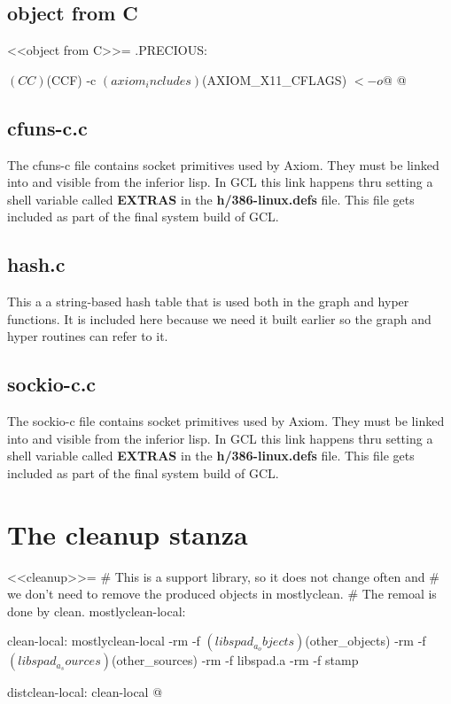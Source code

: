 \documentclass{article}
\begin{document}
\subsection{object from C}
<<object from C>>=
.PRECIOUS: %

	$(CC) $(CCF) -c $(axiom_includes) $(AXIOM_X11_CFLAGS) $< -o $@
@



\subsection{cfuns-c.c \cite{2}}
The cfuns-c file contains socket primitives used by Axiom.
They must be linked into and visible from the inferior lisp.
In GCL this link happens thru setting a shell variable called
{\bf EXTRAS} in the {\bf h/386-linux.defs} file. This file
gets included as part of the final system build of GCL.

\subsection{hash.c \cite{6}}
This a a string-based hash table that is used both in the graph
and hyper functions. It is included here because we need it built
earlier so the graph and hyper routines can refer to it.

\subsection{sockio-c.c \cite{10}}
The sockio-c file contains socket primitives used by Axiom.
They must be linked into and visible from the inferior lisp.
In GCL this link happens thru setting a shell variable called
{\bf EXTRAS} in the {\bf h/386-linux.defs} file. This file
gets included as part of the final system build of GCL.

\section{The cleanup stanza}
<<cleanup>>=
# This is a support library, so it does not change often and
# we don't need to remove the produced objects in mostlyclean.
# The remoal is done by clean.
mostlyclean-local:

clean-local: mostlyclean-local
	-rm -f $(libspad_a_objects) $(other_objects)
	-rm -f $(libspad_a_sources) $(other_sources)
	-rm -f libspad.a
	-rm -f stamp

distclean-local: clean-local
@
\end{document}
